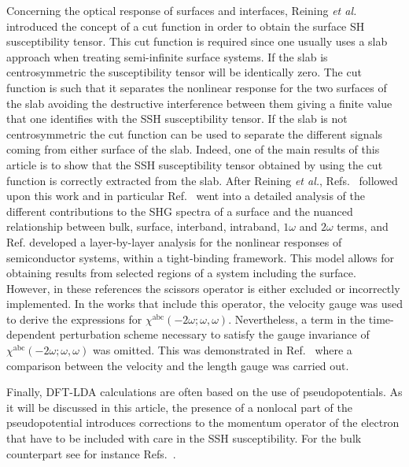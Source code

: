 \documentclass[floatfix,prb,aps,superscriptaddress,showpacs,11pt,preprint,letterpaper]{revtex4}
\def\chon{red}
\begin{document}
Concerning the optical response of surfaces and interfaces, Reining 
\textit{et al.}\cite{reiningPRB94} introduced the concept of a cut function 
in order to obtain the surface SH susceptibility tensor. This cut function 
is required since one usually uses a slab approach when treating semi-infinite 
surface systems.\cite{reiningPRB94} If the slab is centrosymmetric the 
susceptibility tensor will 
be identically zero. The cut function is such that it separates the nonlinear 
response for the two surfaces of the slab avoiding the destructive 
interference between them giving a finite value that one identifies with the 
SSH susceptibility tensor. If the slab is not centrosymmetric the cut function 
can be used to separate the different signals coming from either surface of 
the slab. Indeed, one of the main results of this article is to show that the 
SSH  susceptibility tensor obtained by using the cut function is correctly 
extracted from the slab. After Reining \textit{et al.},\cite{reiningPRB94}
Refs.~ 
followed 
upon this work and in particular Ref.~ went into a 
detailed analysis of the different contributions to the SHG spectra of a 
surface and the nuanced relationship between bulk, surface, interband, 
intraband, $1\omega$ and $2\omega$ terms, and
Ref.  developed a layer-by-layer 
analysis for the nonlinear responses of semiconductor systems, within a 
tight-binding framework. This model allows for obtaining results from 
selected regions of a system including the surface. However, in these 
references the scissors operator is either excluded or incorrectly 
implemented. 
{\color{\chon}In the works that include this operator,  the velocity gauge was
  used to derive the expressions for $\chi^{\mathrm{abc}}(-2\omega;\omega,\omega)$.
Nevertheless, a
  term in the time-dependent perturbation scheme
necessary to satisfy the gauge invariance 
of $\chi^{\mathrm{abc}}(-2\omega;\omega,\omega)$  was omitted. 
This was demonstrated
in
  Ref.~ where a comparison between the
  velocity and the length gauge  
was carried out.
}

Finally, DFT-LDA calculations are often based on the use of pseudopotentials.
As it will be discussed 
in this article, the presence of a nonlocal part of the
pseudopotential introduces
corrections to
the momentum operator of the electron that have to be included with care in 
the SSH susceptibility. 
For the bulk counterpart see for instance Refs.~.  
\end{document}
